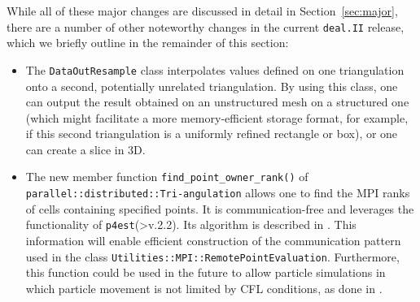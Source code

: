 \documentclass{ansarticle-preprint}
\newcommand{\specialword}[1]{\texttt{#1}}
\newcommand{\dealii}{{\specialword{deal.II}}\xspace}
\newcommand{\pfrst}{{\specialword{p4est}}\xspace}
\begin{document}
While all of these major changes are discussed in detail in
Section~\ref{sec:major}, there
are a number of other noteworthy changes in the current \dealii release,
which we briefly outline in the remainder of this section:
%
\begin{itemize}
  \item The \texttt{DataOutResample} class interpolates values defined on one
  triangulation onto a second, potentially unrelated triangulation.
  By using this class, one can output the result obtained on an
  unstructured mesh on a structured one (which might facilitate a more
  memory-efficient storage format, for example, if this second
  triangulation is a uniformly refined rectangle or box), or one can create a slice in 3D.

\item The new member function \texttt{find\_point\_owner\_rank()} of
        \texttt{parallel\allowbreak ::distributed::\allowbreak Tri-\allowbreak angulation} allows one to find the MPI
  ranks of cells containing specified points.
  It is communication-free and leverages the functionality of \pfrst (>v.2.2).
  Its algorithm is described in \cite{burstedde2020parallel}. This information will
  enable efficient construction of the
  communication pattern used in the class \texttt{Utilities::\allowbreak MPI::\allowbreak RemotePointEvaluation}. Furthermore, this function could be used in the future to allow
  particle simulations in which particle movement is not
  limited by CFL conditions, as done in \cite{mirzadeh2016parallel}.


\end{itemize}
\end{document}
